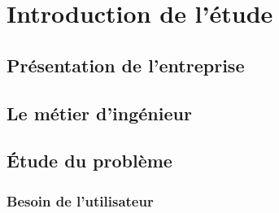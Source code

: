 \cleardoublepage

\chapter{Introduction de l'étude}


\section{Présentation de l'entreprise}


\section{Le métier d'ingénieur}


\section{Étude du problème}


\subsection{Besoin de l'utilisateur}

